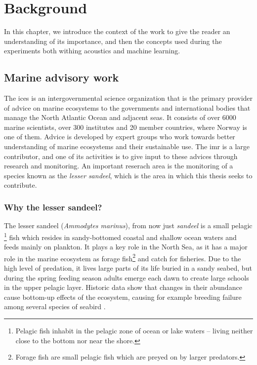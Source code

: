 \chapter{Background}
    In this chapter, we introduce the context of the work to give the reader an understanding of its importance, and then the concepts used during the experiments both withing acoustics and machine learning.
    
    
\section{Marine advisory work}
    The \gls{ices} is an intergovernmental science organization that is the primary provider of advice on marine ecosystems to the governments and international bodies that manage the North Atlantic Ocean and adjacent seas\cite{ICES2020}. It consists of over 6000 marine scientists, over 300 institutes and 20 member countries, where Norway is one of them. Advice is developed by expert groups who work towards better understanding of marine ecosystems and their sustainable use. The \gls{imr} is a large contributor, and one of its activities is to give input to these advices through research and monitoring. An important reserach area is the monitoring of a species known as the \textit{lesser sandeel}, which is the area in which this thesis seeks to contribute.
    
\subsection{Why the lesser sandeel?}
    The lesser sandeel (\textit{Ammodytes marinus}), from now just \textit{sandeel} is
    a small pelagic \footnote{Pelagic fish inhabit in the pelagic zone of ocean or lake waters – living neither close to the bottom nor near the shore.} fish which resides in sandy-bottomed coastal and shallow ocean waters and feeds mainly on plankton. It plays a key role in the North Sea, as it has a major role in the marine ecosystem as forage fish\footnote{Forage fish are small pelagic fish which are preyed on by larger predators.} and catch for fisheries. Due to the high level of predation, it lives large parts of its life buried in a sandy seabed, but during the spring feeding season adults emerge each dawn to create large schools in the upper pelagic layer. Historic data show that changes in their abundance cause bottom-up effects of the ecosystem, causing for example breeding failure among several species of seabird \cite{johnsen2017collective}. 
    
